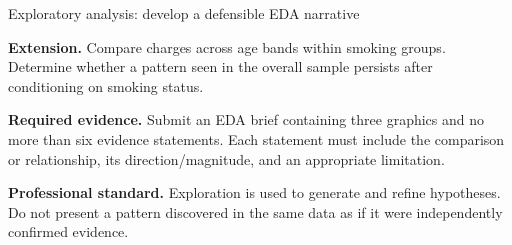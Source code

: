 \begin{labproject}{Exploratory analysis: develop a defensible EDA narrative}
\begin{tryit}
\textbf{Extension.} Compare charges across age bands within smoking groups. Determine whether a pattern seen in the overall sample persists after conditioning on smoking status.
\end{tryit}

\tcbbreak

\begin{verification}
\textbf{Required evidence.} Submit an EDA brief containing three graphics and no more than six evidence statements. Each statement must include the comparison or relationship, its direction/magnitude, and an appropriate limitation.

\textbf{Professional standard.} Exploration is used to generate and refine hypotheses. Do not present a pattern discovered in the same data as if it were independently confirmed evidence.
\end{verification}
\end{labproject}

